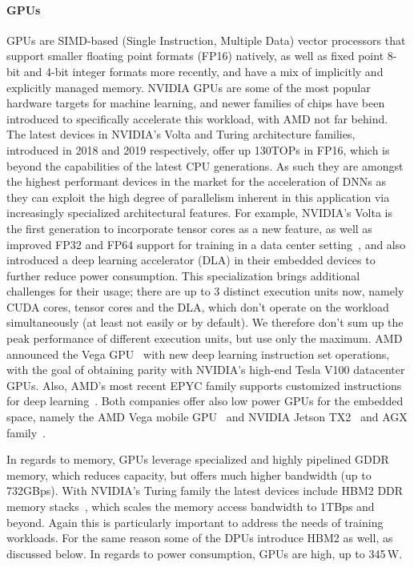 \paragraph*{GPUs} GPUs are SIMD-based (Single Instruction, Multiple Data) vector processors that support smaller floating point formats (FP16) natively, as well as fixed point 8-bit and 4-bit integer formats more recently, and have a mix of implicitly and explicitly managed memory. 
NVIDIA GPUs are some of the most popular hardware targets for machine learning, and newer families of chips have been introduced to specifically accelerate this workload, with AMD not far behind. 
The latest devices in NVIDIA's Volta and Turing architecture families, introduced in 2018 and 2019 respectively, offer up 130TOPs in FP16, which is beyond the capabilities of the latest CPU generations. 
As such they are amongst the highest performant devices in the market for the acceleration of DNNs as they can exploit the high degree of parallelism inherent in this application via increasingly specialized architectural features.
For example, NVIDIA's Volta is the first generation to incorporate tensor cores as a new feature, as well as improved FP32 and FP64 support for training in a data center setting~\cite{NVIDIAv100}, and also introduced a deep learning accelerator (DLA) in their embedded devices to further reduce power consumption. This specialization brings additional challenges for their usage; there are up to 3 distinct execution units now, namely CUDA cores, tensor cores and the DLA, which don't operate on the workload simultaneously (at least not easily or by default). 
We therefore don't sum up the peak performance of different execution units, but use only the maximum.
AMD announced the Vega GPU~\cite{RadeonInstinctGPU} with new deep learning instruction set operations, with the goal of obtaining parity with NVIDIA's high-end Tesla V100 datacenter GPUs.  Also, AMD's  most recent EPYC family supports customized instructions for deep learning~\cite{epyc}. 
Both companies offer also low power GPUs for the embedded space, namely the AMD Vega mobile GPU~\cite{radeon-mobile} and NVIDIA Jetson TX2~\cite{nvidia-jetson} and AGX family~\cite{agx}.

In regards to memory, GPUs leverage specialized and highly pipelined GDDR memory, which reduces capacity, but offers much higher bandwidth (up to 732GBps). With NVIDIA's Turing family the latest devices include HBM2 DDR memory stacks~\cite{turing}, which scales the memory access bandwidth to 1TBps and beyond. 
Again this is particularly important to address the needs of training workloads.
For the same reason some of the DPUs introduce HBM2 as well, as discussed below. 
In regards to power consumption, GPUs are high, up to 345\,W.

